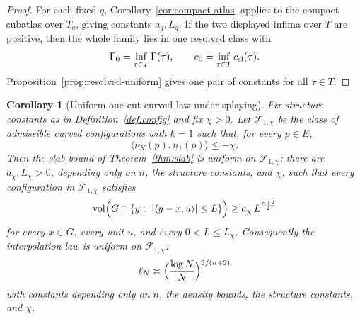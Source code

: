 \documentclass[11pt]{article}
\newtheorem{corollary}[theorem]{Corollary}
\newcommand{\vol}{\operatorname{vol}}
\begin{document}
\begin{proof}
For each fixed \(q\), Corollary~\ref{cor:compact-atlas} applies to the compact
subatlas over \(T_q\), giving constants \(a_q,L_q\).  If the two displayed
infima over \(T\) are positive, then the whole family lies in one resolved class
with
\[
  \Gamma_0=\inf_{\tau\in T}\Gamma(\tau),\qquad
  c_0=\inf_{\tau\in T}c_{\rm sl}(\tau).
\]
Proposition~\ref{prop:resolved-uniform} gives one pair of constants for all
\(\tau\in T\).
\end{proof}

\begin{corollary}[Uniform one-cut curved law under splaying]
\label{cor:onecut-uniform}
Fix structure constants as in Definition~\ref{def:config} and fix
\(\chi>0\).  Let \(\mathcal F_{1,\chi}\) be the class of admissible curved
configurations with \(k=1\) such that, for every \(p\in E\),
\[
  \langle \nu_K(p),n_1(p)\rangle\le -\chi .
\]
Then the slab bound of Theorem~\ref{thm:slab} is uniform on
\(\mathcal F_{1,\chi}\): there are \(a_\chi,L_\chi>0\), depending only on
\(n\), the structure constants, and \(\chi\), such that every configuration in
\(\mathcal F_{1,\chi}\) satisfies
\[
\vol\Bigl(G\cap\{y:\ |\langle y-x,u\rangle|\le L\}\Bigr)
\ge a_\chi\,L^{\frac{n+2}2}
\]
for every \(x\in G\), every unit \(u\), and every \(0<L\le L_\chi\).
Consequently the interpolation law is uniform on \(\mathcal F_{1,\chi}\):
\[
  \ell_N\asymp\Bigl(\frac{\log N}{N}\Bigr)^{2/(n+2)}
\]
with constants depending only on \(n\), the density bounds, the structure
constants, and \(\chi\).
\end{corollary}
\end{document}
